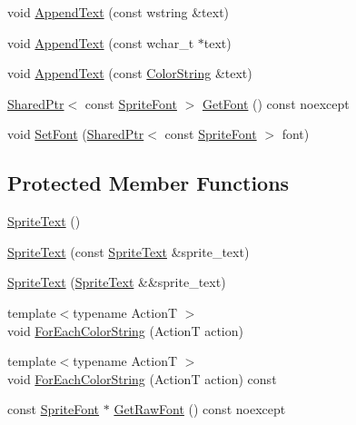 \begin{DoxyCompactItemize}
\item 
void \hyperlink{classmage_1_1_sprite_text_acf993532a7b2e6ebb761b9b47cbdba98}{Append\+Text} (const wstring \&text)
\item 
void \hyperlink{classmage_1_1_sprite_text_a462809b9138f94720f972505a4f74d81}{Append\+Text} (const wchar\+\_\+t $\ast$text)
\item 
void \hyperlink{classmage_1_1_sprite_text_a914e7f755cf8b6ddd22dd66c9108029b}{Append\+Text} (const \hyperlink{classmage_1_1_color_string}{Color\+String} \&text)
\item 
\hyperlink{namespacemage_a1e01ae66713838a7a67d30e44c67703e}{Shared\+Ptr}$<$ const \hyperlink{classmage_1_1_sprite_font}{Sprite\+Font} $>$ \hyperlink{classmage_1_1_sprite_text_aa1aab1690f37220babce2639463bd7d5}{Get\+Font} () const noexcept
\item 
void \hyperlink{classmage_1_1_sprite_text_a99402a3ca60e50f606e6cce7bc8b2828}{Set\+Font} (\hyperlink{namespacemage_a1e01ae66713838a7a67d30e44c67703e}{Shared\+Ptr}$<$ const \hyperlink{classmage_1_1_sprite_font}{Sprite\+Font} $>$ font)
\end{DoxyCompactItemize}
\subsection*{Protected Member Functions}
\begin{DoxyCompactItemize}
\item 
\hyperlink{classmage_1_1_sprite_text_ae55645d53a2f774703603139a80dd84b}{Sprite\+Text} ()
\item 
\hyperlink{classmage_1_1_sprite_text_a3e56a7882dd714a6d8f2452d4f7071ff}{Sprite\+Text} (const \hyperlink{classmage_1_1_sprite_text}{Sprite\+Text} \&sprite\+\_\+text)
\item 
\hyperlink{classmage_1_1_sprite_text_ab03ba1fb607ce86d28b742fc020c8a62}{Sprite\+Text} (\hyperlink{classmage_1_1_sprite_text}{Sprite\+Text} \&\&sprite\+\_\+text)
\item 
{\footnotesize template$<$typename ActionT $>$ }\\void \hyperlink{classmage_1_1_sprite_text_ad975957b908ad3926ace75fb60ff4474}{For\+Each\+Color\+String} (ActionT action)
\item 
{\footnotesize template$<$typename ActionT $>$ }\\void \hyperlink{classmage_1_1_sprite_text_abc70368fd800a82cbd1ec31f51d4db17}{For\+Each\+Color\+String} (ActionT action) const
\item 
const \hyperlink{classmage_1_1_sprite_font}{Sprite\+Font} $\ast$ \hyperlink{classmage_1_1_sprite_text_ab3124ee856ef6da31745af152840a8ce}{Get\+Raw\+Font} () const noexcept
\end{DoxyCompactItemize}
